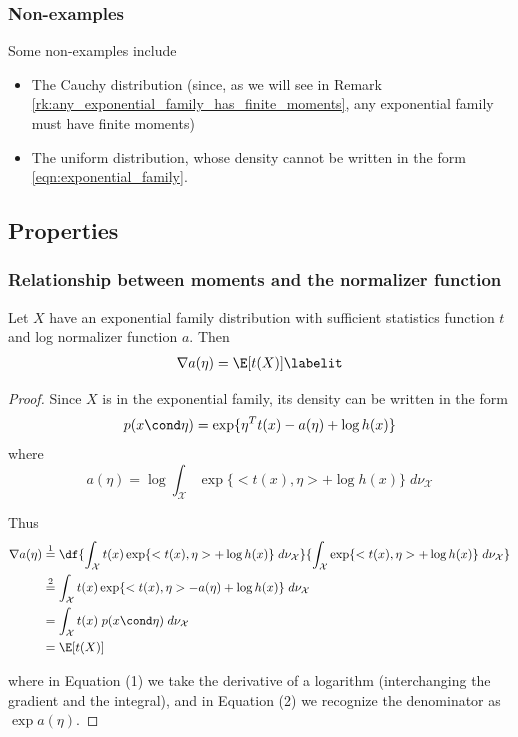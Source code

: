 \documentclass{article} %
\begin{document}
\subsubsection{Non-examples}

Some non-examples include 
\begin{itemize}
\item The Cauchy distribution (since, as we will see in Remark \ref{rk:any_exponential_family_has_finite_moments}, any exponential family must have finite moments)
\item The uniform distribution, whose density cannot be written in the form \eqref{eqn:exponential_family}. %
\end{itemize}


\subsection{Properties}

\subsubsection{Relationship between moments and the normalizer function}
\begin{proposition}
Let $X$ have an exponential family distribution with sufficient statistics function $t$ and log normalizer function $a$.   Then  
\begin{align*}
\nabla a(\eta) = \E[t(X)] 
\labelit \label{eqn:expected_sufficient_statistic_as_derivative_of_log_normalizer}	
\end{align*}

\begin{proof}

Since $X$ is in the exponential family, its density can be written in the form
 \[ p(x \cond \eta) =  \exp \{ \eta^T t(x) - a(\eta) + \log h(x)\} \] 
where 
\[a(\eta) = \log \int_{\mathcal{X}} \exp \{ <t(x), \eta> + \log h(x) \} \; d\nu_{\mathcal{X}} \] 

Thus
\begin{align*}
\nabla a (\eta) & \stackrel{1}{=}  \df{ \int_{\mathcal{X}} t(x)  \exp \{ <t(x), \eta> + \log h(x) \} \; d\nu_{\mathcal{X}} }{\int_{\mathcal{X}} \exp \{ <t(x), \eta> + \log h(x) \} \; d\nu_{\mathcal{X}} } \\
& \stackrel{2}{=} \int_{\mathcal{X}} t(x)  \exp \{ <t(x), \eta> - a(\eta) + \log h(x) \} \; d\nu_{\mathcal{X}}  \\
& = \int_{\mathcal{X}} t(x)  \; p(x \cond \eta) \; d\nu_{\mathcal{X}}  \\
&= \E[t(X)]
\end{align*}

where in  Equation (1) we take the derivative of a logarithm (interchanging the gradient and the integral), and in Equation (2) we recognize the denominator as $\exp a(\eta)$.	
\end{proof}

\label{prop:expected_sufficient_statistic_as_derivative_of_log_normalizer}
\end{proposition}
\end{document}
